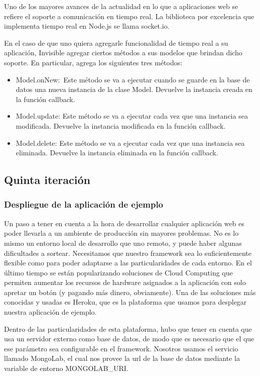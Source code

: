 \documentclass[doc,helv,longtable]{article}
\begin{document}
Uno de los mayores avances de la actualidad en lo que a aplicaciones web se refiere el soporte a comunicación en tiempo real. La biblioteca por excelencia que implementa tiempo real en Node.js se llama socket.io. 

En el caso de que uno quiera agregarle funcionalidad de tiempo real a su aplicación, Invisible agregar ciertos métodos a sus modelos que brindan dicho soporte. En particular, agrega los siguientes tres métodos:


\begin{itemize}
\item  Model.onNew: Este método se va a ejecutar cuando se guarde en la base de datos una nueva instancia de la clase Model. Devuelve la instancia creada en la función callback.
\item  Model.update: Este método se va a ejecutar cada vez que una instancia sea modificada. Devuelve la instancia modificada en la función callback.
\item  Model.delete: Este método se va a ejecutar cada vez que una instancia sea eliminada. Devuelve la instancia eliminada en la función callback.

\end{itemize}
\subsection{Quinta iteración}
\subsubsection{Despliegue de la aplicación de ejemplo}


Un paso a tener en cuenta a la hora de desarrollar cualquier aplicación web es poder llevarla a un ambiente de producción sin mayores problemas. No es lo mismo un entorno local de desarrollo que uno remoto, y puede haber algunas dificultades a sortear. Necesitamos que nuestro framework sea lo suficientemente flexible como para poder adaptarse a las particularidades de cada entorno. En el último tiempo se están popularizando soluciones de Cloud Computing que permiten aumentar los recursos de hardware asignados a la aplicación con solo apretar un botón (y pagando más dinero, obviamente). Una de las soluciones más conocidas y usadas es Heroku\cite{heroku}, que es la plataforma que usamos para desplegar nuestra aplicación de ejemplo. 

Dentro de las particularidades de esta plataforma, hubo que tener en cuenta que usa un servidor externo como base de datos, de modo que es necesario que el que ese parámetro sea configurable en el framework. Nosotros usamos el servicio llamado MongoLab\cite{mongolab}, el cual nos provee la url de la base de datos mediante la variable de entorno MONGOLAB\_URI.
\end{document}
